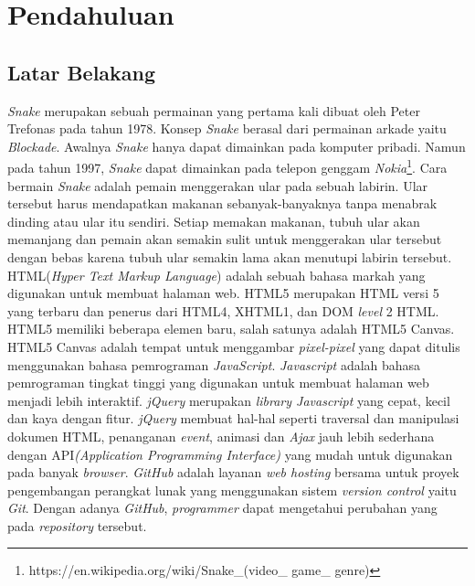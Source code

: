 \chapter{Pendahuluan}
\label{chap:intro}
   
\section{Latar Belakang}
\label{sec:label}

\textit{Snake} merupakan sebuah permainan yang pertama kali dibuat oleh Peter Trefonas pada tahun 1978. Konsep \textit{Snake} berasal dari permainan arkade yaitu \textit{Blockade}. Awalnya \textit{Snake} hanya dapat dimainkan pada komputer pribadi. Namun pada tahun 1997, \textit{Snake} dapat dimainkan pada telepon genggam \textit{Nokia}\footnote{https://en.wikipedia.org/wiki/Snake\_(video\_ game\_ genre)}. Cara bermain \textit{Snake} adalah pemain menggerakan ular pada sebuah labirin. Ular tersebut harus mendapatkan makanan sebanyak-banyaknya tanpa menabrak dinding atau ular itu sendiri. Setiap memakan makanan, tubuh ular akan memanjang dan pemain akan semakin sulit untuk menggerakan ular tersebut dengan bebas karena tubuh ular semakin lama akan menutupi labirin tersebut. \\

HTML(\textit{Hyper Text Markup Language}) adalah sebuah bahasa markah yang digunakan untuk membuat halaman web. HTML5 merupakan HTML versi 5 yang terbaru dan penerus dari HTML4, XHTML1, dan DOM \textit{level} 2 HTML. HTML5 memiliki beberapa elemen baru, salah satunya adalah HTML5 Canvas. HTML5 Canvas adalah tempat untuk menggambar \textit{pixel-pixel} yang dapat ditulis menggunakan bahasa pemrograman \textit{JavaScript}. \textit{Javascript} adalah bahasa pemrograman tingkat tinggi yang digunakan untuk membuat halaman web menjadi lebih interaktif. \textit{jQuery} merupakan \textit{library Javascript} yang cepat, kecil dan kaya dengan fitur. \textit{jQuery} membuat hal-hal seperti traversal dan manipulasi dokumen HTML, penanganan \textit{event}, animasi dan \textit{Ajax} jauh lebih sederhana dengan API\textit{(Application Programming Interface)} yang mudah untuk digunakan pada banyak \textit{browser}. \textit{GitHub} adalah layanan \textit{web hosting} bersama untuk proyek pengembangan perangkat lunak yang menggunakan sistem \textit{version control} yaitu \textit{Git}. Dengan adanya \textit{GitHub}, \textit{programmer} dapat mengetahui perubahan yang pada \textit{repository} tersebut. \\

